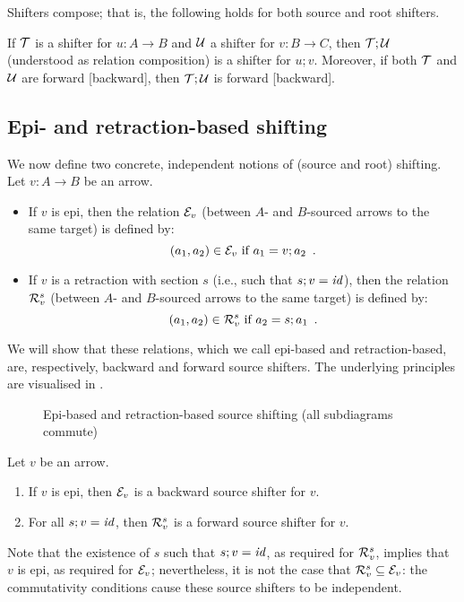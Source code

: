Shifters compose; that is, the following holds for both source and root shifters.
%
\begin{proposition}
If $\mathcal{T}$ is a shifter for $u:A\to B$ and $\mathcal{U}$ a shifter for $v:B\to C$, then $\mathcal{T};\mathcal{U}$ (understood as relation composition) is a shifter for $u;v$. Moreover, if both $\mathcal{T}$ and $\mathcal{U}$ are forward [backward], then $\mathcal{T};\mathcal{U}$ is forward [backward].
\end{proposition}

\subsection{Epi- and retraction-based shifting}

We now define two concrete, independent notions of (source and root) shifting. 
Let $v:A\to B$ be an arrow.
\begin{itemize}
\item If $v$ is epi, then the relation $\mathcal{E}_v$ (between $A$- and $B$-sourced arrows to the same target) is defined by:
\[ (a_1,a_2)\in \mathcal{E}_v \text{ if } a_1=v;a_2 \enspace.
\]
\item If $v$ is a retraction with section $s$ (i.e., such that $s;v=\mathit{id}$), then the relation $\mathcal{R}_v^s$ (between $A$- and $B$-sourced arrows to the same target) is defined by:
\[ (a_1,a_2)\in \mathcal{R}_v^s \text{ if } a_2=s;a_1 \enspace.
\]
\end{itemize}
%
We will show that these relations, which we call epi-based and retraction-based, are, respectively, backward and forward source shifters. The underlying principles are visualised in .
%
\begin{figure}
\centering

\caption{Epi-based and retraction-based source shifting (all subdiagrams commute)}
\end{figure}

\begin{proposition}
Let $v$ be an arrow.
\begin{enumerate}
\item If $v$ is epi, then $\mathcal{E}_v$ is a backward source shifter for $v$.
\item For all $s;v=\mathit{id}$, then $\mathcal{R}_v^s$ is a forward source shifter for $v$.
\end{enumerate}
\end{proposition}
%
Note that the existence of $s$ such that $s;v=\mathit{id}$, as required for $\mathcal{R}_v^s$, implies that $v$ is epi, as required for $\mathcal{E}_v$; nevertheless, it is not the case that $\mathcal{R}_v^s\subseteq\mathcal{E}_v$: the commutativity conditions cause these source shifters to be independent.

